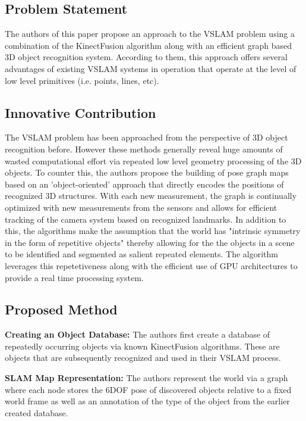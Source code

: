 \documentclass[10pt,twocolumn,letterpaper]{article}
\begin{document}
\subsection{Problem Statement}
The authors of this paper propose an approach to the VSLAM problem using a combination of the KinectFusion algorithm along with an efficient graph based 3D object recognition system. According to them, this approach offers several advantages of existing VSLAM systems in operation that operate at the level of low level primitives (i.e. points, lines, etc). 

\subsection{Innovative Contribution}
The VSLAM problem has been approached from the perspective of 3D object recognition before. However these methods generally reveal  huge amounts of wasted computational effort via repeated low level geometry processing of the 3D objects. To counter this, the authors propose the building of pose graph maps based on an 'object-oriented' approach that directly encodes the positions of recognized 3D structures. With each new measurement, the graph is continually optimized with new measurements from the sensors and allows for efficient tracking of the camera system based on recognized landmarks. In addition to this, the algorithms make the assumption that the world has "intrinsic symmetry in the form of repetitive objects" thereby allowing for the the objects in a scene to be identified and segmented as salient repeated elements. The algorithm leverages this repetetiveness along with the efficient use of GPU architectures to provide a real time processing system. 

\subsection{Proposed Method}
\textbf{Creating an Object Database:} The authors first create a database of repeatedly occurring objects via known KinectFusion algorithms. These are objects that are subsequently recognized and used in their VSLAM process. 

\textbf{SLAM Map Representation:} The authors represent the world via a graph where each node stores the 6DOF pose of discovered objects relative to a fixed world frame as well as an annotation of the type of the object from the earlier created database. 
\end{document}
